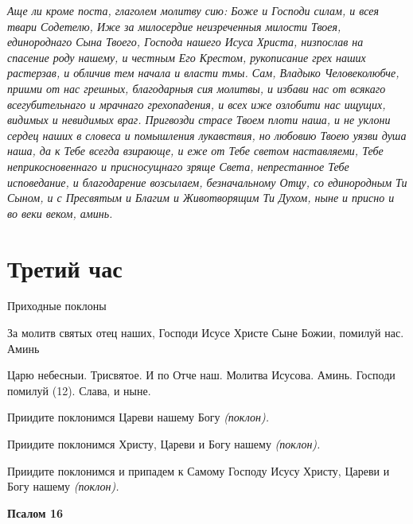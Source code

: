 \itshape Аще ли кроме поста, глаголем молитву сию:\normalfont{} Боже и Господи силам, и всея твари Содетелю, Иже за милосердие неизреченныя милости Твоея, единороднаго Сына Твоего, Господа нашего Исуса Христа, низпослав на спасение роду нашему, и честным Его Крестом, рукописание грех наших растерзав, и обличив тем начала и власти тмы. Сам, Владыко Человеколюбче, приими от нас грешных, благодарныя сия молитвы, и избави нас от всякаго всегубительнаго и мрачнаго грехопадения, и всех иже озлобити нас ищущих, видимых и невидимых враг. Пригвозди страсе Твоем плоти наша, и не уклони сердец наших в словеса и помышления лукавствия, но любовию Твоею уязви душа наша, да к Тебе всегда взирающе, и еже от Тебе светом наставляеми, Тебе неприкосновеннаго и присносущнаго зряще Света, непрестанное Тебе исповедание, и благодарение возсылаем, безначальному Отцу, со единородным Ти Сыном, и с Пресвятым и Благим и Животворящим Ти Духом, ныне и присно и во веки веком, аминь.




\section{Третий час}
 


Приходные поклоны


За молитв святых отец наших, Господи Исусе Христе Сыне Божии, помилуй нас. Аминь


Царю небесныи. Трисвятое. И по Отче наш. Молитва Исусова. Аминь. Господи помилуй (12). Слава, и ныне.


Приидите поклонимся Цареви нашему Богу \itshape (поклон)\normalfont{}.


Приидите поклонимся Христу, Цареви и Богу нашему \itshape (поклон)\normalfont{}.


Приидите поклонимся и припадем к Самому Господу Исусу Христу, Цареви и Богу нашему \itshape (поклон)\normalfont{}.





\bfseries Псалом 16\normalfont{}


